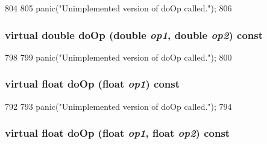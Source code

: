 \begin{DoxyCode}
804     {
805         panic("Unimplemented version of doOp called.\n");
806     }
\end{DoxyCode}
\hypertarget{classArmISA_1_1FpOp_a42bfa4e0c737bc1df68d12362d927535}{
\subsubsection[{doOp}]{\setlength{\rightskip}{0pt plus 5cm}virtual double doOp (double {\em op1}, \/  double {\em op2}) const}}
\label{classArmISA_1_1FpOp_a42bfa4e0c737bc1df68d12362d927535}



\begin{DoxyCode}
798     {
799         panic("Unimplemented version of doOp called.\n");
800     }
\end{DoxyCode}
\hypertarget{classArmISA_1_1FpOp_aec4d44856f9781717b36125acfcc45d3}{
\subsubsection[{doOp}]{\setlength{\rightskip}{0pt plus 5cm}virtual float doOp (float {\em op1}) const}}
\label{classArmISA_1_1FpOp_aec4d44856f9781717b36125acfcc45d3}



\begin{DoxyCode}
792     {
793         panic("Unimplemented version of doOp called.\n");
794     }
\end{DoxyCode}
\hypertarget{classArmISA_1_1FpOp_ae6e7fab9137bf946035338c924967bde}{
\subsubsection[{doOp}]{\setlength{\rightskip}{0pt plus 5cm}virtual float doOp (float {\em op1}, \/  float {\em op2}) const}}
\label{classArmISA_1_1FpOp_ae6e7fab9137bf946035338c924967bde}



